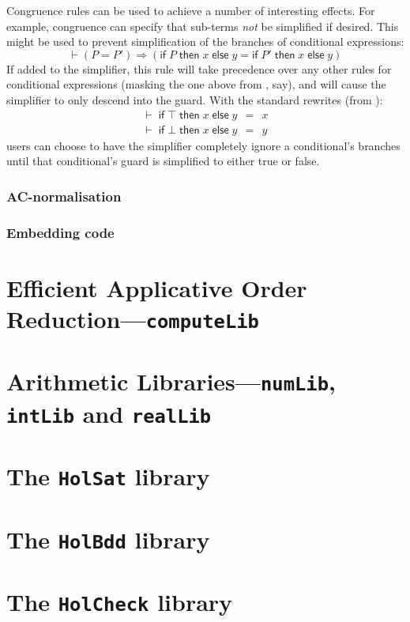 Congruence rules can be used to achieve a number of interesting
effects.  For example, congruence can specify that sub-terms
\emph{not} be simplified if desired.  This might be used to prevent
simplification of the branches of conditional expressions:
\[
\vdash (P = P') \Rightarrow
       (\textsf{if}\;P\;\textsf{then}\;x\;\textsf{else}\;y =
       \textsf{if}\;P'\;\textsf{then}\;x\;\textsf{else}\;y)
\]
If added to the simplifier, this rule will take precedence over any
other rules for conditional expressions (masking the one above from
, say), and will cause the simplifier to only descend
into the guard.  With the standard rewrites (from ):
\[
\begin{array}{l}
\vdash \;\textsf{if}\;\top\;\textsf{then}\;x\;\textsf{else}\;y \,\;=\,\; x\\
\vdash \;\textsf{if}\;\bot\;\textsf{then}\;x\;\textsf{else}\;y \,\;=\,\; y
\end{array}
\]
users can choose to have the simplifier completely ignore
a conditional's branches until that conditional's guard is simplified
to either true or false.


\subsubsection{AC-normalisation}

\subsubsection{Embedding code}


\section{Efficient Applicative Order Reduction---\texttt{computeLib}}
\label{sec:computeLib}

\section{Arithmetic Libraries---\texttt{numLib}, \texttt{intLib} and \texttt{realLib}}
\label{sec:numLib}

\section{The \texttt{HolSat} library}\label{sec:HolSatLib}
\section{The \texttt{HolBdd} library}\label{sec:HolBddLib}
\section{The \texttt{HolCheck} library}\label{sec:HolCheckLib}


